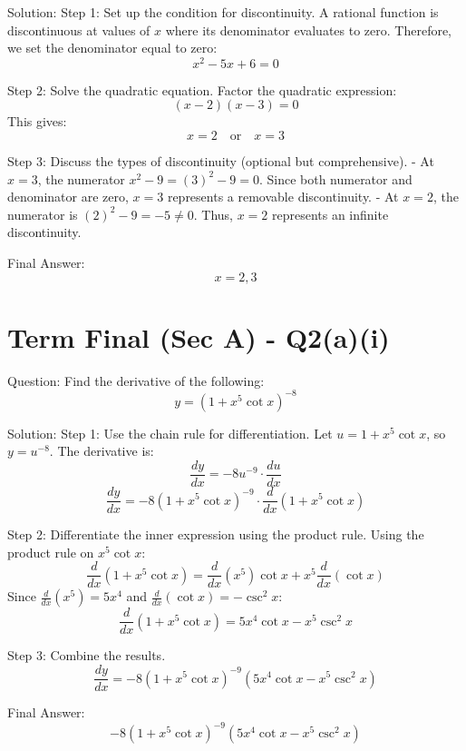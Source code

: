 \documentclass{article}
\begin{document}
Solution:
Step 1: Set up the condition for discontinuity.
A rational function is discontinuous at values of $x$ where its denominator evaluates to zero.
Therefore, we set the denominator equal to zero:
\[
x^2 - 5x + 6 = 0
\]

Step 2: Solve the quadratic equation.
Factor the quadratic expression:
\[
(x - 2)(x - 3) = 0
\]
This gives:
\[
x = 2 \quad \text{or} \quad x = 3
\]

Step 3: Discuss the types of discontinuity (optional but comprehensive).
- At $x = 3$, the numerator $x^2 - 9 = (3)^2 - 9 = 0$. Since both numerator and denominator are zero, $x = 3$ represents a removable discontinuity.
- At $x = 2$, the numerator is $(2)^2 - 9 = -5 \ne 0$. Thus, $x = 2$ represents an infinite discontinuity.

Final Answer:
\[
\boxed{x = 2, 3}
\]

\section*{Term Final (Sec A) - Q2(a)(i)}
Question:
Find the derivative of the following:
\[
y = (1 + x^5 \cot x)^{-8}
\]

Solution:
Step 1: Use the chain rule for differentiation.
Let $u = 1 + x^5 \cot x$, so $y = u^{-8}$.
The derivative is:
\[
\frac{dy}{dx} = -8u^{-9} \cdot \frac{du}{dx}
\]
\[
\frac{dy}{dx} = -8(1 + x^5 \cot x)^{-9} \cdot \frac{d}{dx}(1 + x^5 \cot x)
\]

Step 2: Differentiate the inner expression using the product rule.
Using the product rule on $x^5 \cot x$:
\[
\frac{d}{dx}(1 + x^5 \cot x) = \frac{d}{dx}(x^5) \cot x + x^5 \frac{d}{dx}(\cot x)
\]
Since $\frac{d}{dx}(x^5) = 5x^4$ and $\frac{d}{dx}(\cot x) = -\csc^2 x$:
\[
\frac{d}{dx}(1 + x^5 \cot x) = 5x^4 \cot x - x^5 \csc^2 x
\]

Step 3: Combine the results.
\[
\frac{dy}{dx} = -8(1 + x^5 \cot x)^{-9} (5x^4 \cot x - x^5 \csc^2 x)
\]

Final Answer:
\[
\boxed{-8(1 + x^5 \cot x)^{-9} (5x^4 \cot x - x^5 \csc^2 x)}
\]
\end{document}
